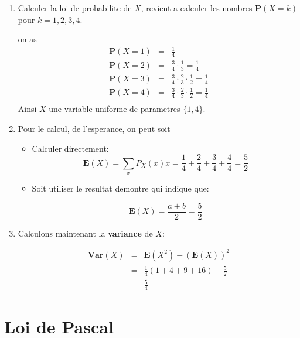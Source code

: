 \documentclass[a4paper]{tufte-handout}
\begin{document}
\begin{enumerate}
  \item 
Calculer la loi de probabilite de $X$, revient a calculer les nombres
$\mathbf{P}(X=k)$ pour $k = 1, 2,3,4$.

on as 
\begin{eqnarray*}
  \mathbf{P}(X = 1) & = & \frac{1}{4}\\
  \mathbf{P}(X = 2) & = & \frac{3}{4}\cdot\frac{1}{3} = \frac{1}{4}\\
  \mathbf{P}(X = 3) & = & \frac{3}{4}\cdot\frac{2}{3}\cdot\frac{1}{2} = \frac{1}{4}\\
  \mathbf{P}(X = 4) & = &\frac{3}{4}\cdot\frac{2}{3}\cdot\frac{1}{2} = \frac{1}{4} \\
\end{eqnarray*}
Ainsi $X$ une variable uniforme de parametres $\{1, 4\}$.
\item Pour le calcul, de l'esperance, on peut soit 
  \begin{itemize}
    \item Calculer directement:
      $$
      \mathbf{E}(X) = \sum_x P_X(x)x = \frac{1}{4} + \frac{2}{4} + \frac{3}{4} +
      \frac{4}{4} = \frac{5}{2}
      $$
    \item Soit utiliser le resultat demontre qui indique que:

      $$
      \mathbf{E}(X) = \frac{a +b}{2} = \frac{5}{2}
      $$
  \end{itemize}
\item Calculons maintenant la \textbf{variance} de $X$:
      
    \begin{eqnarray*}
      \textbf{Var}(X) &=& \textbf{E}(X^2) - (\mathbf{E}(X))^2\\
                      &=& \frac{1}{4}\left(1 + 4 + 9 + 16\right)- \frac{5}{2}\\
                      &=& \frac{5}{4}
    \end{eqnarray*}
\end{enumerate}

\section{Loi de Pascal}
\end{document}
